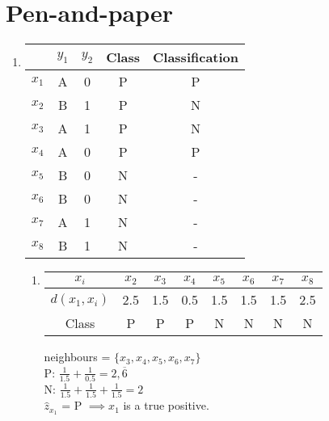 \documentclass[12pt,a4paper]{article}
\newcommand{\subscript}[2]{$#1 _ #2$}
\begin{document}
\section{Pen-and-paper}
\begin{enumerate}
	\item
	      \begin{tabular}[t]{|c|c|c|c|c|}
		      \hline
		            & $y_1$ & $y_2$ & Class & Classification \\
		      \hline
		      $x_1$ & A     & 0     & P     & P              \\
		      \hline
		      $x_2$ & B     & 1     & P     & N              \\
		      \hline
		      $x_3$ & A     & 1     & P     & N              \\
		      \hline
		      $x_4$ & A     & 0     & P     & P              \\
		      \hline
		      $x_5$ & B     & 0     & N     & -              \\
		      \hline
		      $x_6$ & B     & 0     & N     & -              \\
		      \hline
		      $x_7$ & A     & 1     & N     & -              \\
		      \hline
		      $x_8$ & B     & 1     & N     & -              \\
		      \hline
	      \end{tabular}

	      \vspace{5px}

	      \begin{enumerate}[label=\subscript{x}{{\arabic*}})]
		      \item
		            \begin{tabular}[t]{|c|c|c|c|c|c|c|c|}
			            \hline
			            $x_i$         & $x_2$ & $x_3$ & $x_4$ & $x_5$ & $x_6$ & $x_7$ & $x_8$ \\
			            \hline
			            $d(x_1, x_i)$ & 2.5   & 1.5   & 0.5   & 1.5   & 1.5   & 1.5   & 2.5   \\
			            \hline
			            Class         & P     & P     & P     & N     & N     & N     & N     \\
			            \hline
		            \end{tabular}

		            \vspace{5px}

		            neighbours = $\{x_3, x_4, x_5, x_6, x_7\}$ \\
		            P: $\frac{1}{1.5} + \frac{1}{0.5} = 2,\overline{6}$ \\
		            N: $\frac{1}{1.5} + \frac{1}{1.5} + \frac{1}{1.5} = 2$ \\
		            $\hat{z}_{x_1}$ = P $\implies x_1$ is a true positive.


\end{enumerate}
\end{enumerate}
\end{document}
